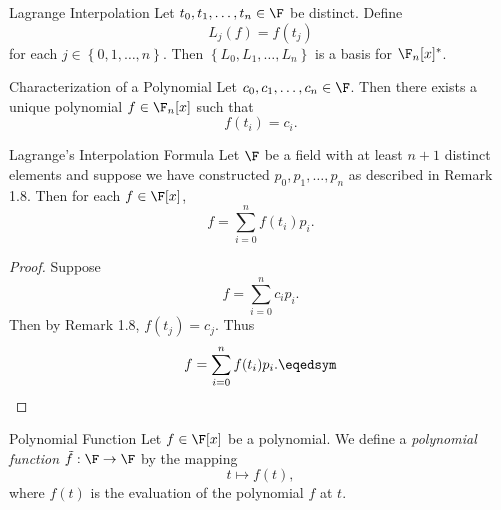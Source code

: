 \documentclass[linearalgebraII]{subfiles}
\begin{document}
    \begin{theorem}{Lagrange Interpolation}
        Let $t_0,t_1,\ldots,t_n\in\F$ be distinct. Define
        \begin{equation*}
            L_j(f) = f(t_j)
        \end{equation*}
        for each $j\in \left\lbrace 0, 1, \ldots, n \right\rbrace$. Then $\left\lbrace L_0, L_1, \ldots, L_n \right\rbrace$ is a basis for $\F_n[x]^*$.
    \end{theorem}

    \begin{cor}{Characterization of a Polynomial}
        Let $c_0, c_1, \ldots, c_n\in \F$. Then there exists a unique polynomial $f\in \F_n[x]$ such that
        \begin{equation*}
            f(t_i) = c_i.
        \end{equation*}
    \end{cor}	

    \begin{cor}{Lagrange's Interpolation Formula}
        Let $\F$ be a field with at least $n+1$ distinct elements and suppose we have constructed $p_0, p_1, \ldots, p_n$ as described in Remark 1.8. Then for each $f\in \F[x]$,
        \begin{equation*}
            f = \sum^{n}_{i=0} f(t_i)p_i.
        \end{equation*}
    \end{cor}	

    \begin{proof}
        Suppose
        \begin{equation*}
            f = \sum^{n}_{i=0} c_ip_i.
        \end{equation*}
        Then by Remark 1.8, $f\left( t_j \right) = c_j$. Thus
        \begin{equation*}
            f = \sum^{n}_{i=0} f(t_i)p_i. \eqedsym
        \end{equation*}
    \end{proof}

    \begin{definition}{Polynomial Function}{}
        Let $f\in \F[x]$ be a polynomial. We define a \emph{polynomial function} $\tilde{f}:\F\to\F$ by the mapping 
        \begin{equation*}
            t\mapsto f(t), 
        \end{equation*}
        where $f(t)$ is the evaluation of the polynomial $f$ at $t$.
    \end{definition}
\end{document}
